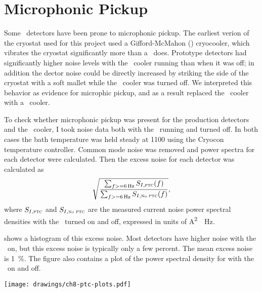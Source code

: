 \section{Microphonic Pickup}


Some \TES\ detectors have been prone to microphonic pickup.
The earliest verion of the cryostat used for this project used a Gifford-McMahon (\GM) cryocooler, which vibrates the cryostat significantly more than a \PTC\ does.
Prototype detectors had significantly higher noise levels with the \GM\ cooler running than when it was off; in addition the dector noise could be directly increased by striking the side of the cryostat with a soft mallet while the \GM\ cooler was turned off.
We interpreted this behavior as evidence for microphic pickup, and as a result replaced the \GM\ cooler with a \PTC\ cooler.

To check whether microphonic pickup was present for the production detectors and the \PTC\ cooler, I took noise data both with the \PTC\ running and turned off.
In both cases the bath temperature was held steady at \SI{1100}{\mK} using the Cryocon temperature controller.
Common mode noise was removed and power spectra for each detector were calculated.
Then the excess noise for each detector was calculated as
\begin{equation}
  \sqrt{  \frac{ \sum_{f >= \SI{6}{\Hz}} S_{I,\textsc{ptc}}(f) }
               { \sum_{f >= \SI{6}{\Hz}} S_{I,\mbox{\tiny{No}}\textsc{ ptc}}(f) }},
\end{equation}
where $S_{I,\textsc{ptc}}$ and $S_{I,\mbox{\tiny{No}}\textsc{ ptc}}$ are the measured current noise power spectral densities with the \PTC\ turned on and off, expressed in units of \si{\A^2 \per \Hz}.

 shows a histogram of this excess noise. Most detectors have higher noise with the \PTC\ on, but this excess noise is typically only a few percent. 
The mean excess noise is \SI{1}{\percent}.
The figure also contains a plot of the power spectral density for  with the \PTC\ on and off.

\begin{figure*}
  \centering
\texttt{[image: drawings/ch8-ptc-plots.pdf]}
\caption{%
\textbf{Top}
Histogram showing excess noise due to \PTC, defined as ratio of total noise above \SI{6}{\Hz} (see text for precise definition).
More detectors have higher noise with \PTC\ on than off, but the mean exces noise is only \SI{1}{\percent}.
\textbf{Bottom}
Current noise for  with \PTC\ on and off, after subtracting common mode noise.
The noise below \SI{30}{\Hz} is 1.5--2.5 times higher with the \PTC\ on, but the total standard deviation of the relevant frequencies of $f >= \SI{6}{\Hz}$ is only \SI{2.9}{\percent}.
}
\label{fig:ch8-ptc-plots}
\end{figure*}

